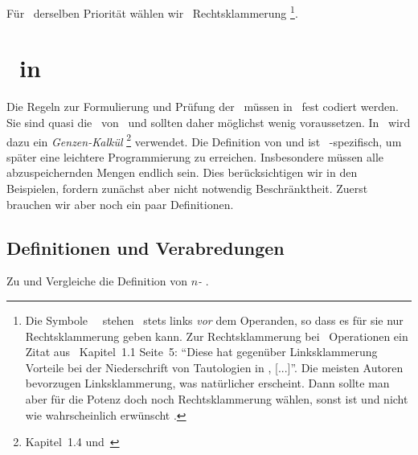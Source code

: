 Für \Operationen\ derselben Priorität wählen wir \hier\ Rechtsklammerung%
\footnote{%
	Die Symbole \unaerer\ \Operationen\ stehen \hier\ stets links \emph{vor} dem Operanden, so dass es für sie nur Rechtsklammerung geben kann.
	Zur Rechtsklammerung bei \binaeren\ Operationen ein Zitat aus~\cite{bib:Rautenberg} Kapitel~1.1 Seite~5:
	"`Diese hat gegenüber Linksklammerung Vorteile bei der Niederschrift von Tautologien in \OjkImp, [...]"'.
	Die meisten Autoren bevorzugen Linksklammerung, was natürlicher erscheint.
	Dann sollte man aber für die Potenz doch noch Rechtsklammerung wählen, sonst ist  und nicht wie wahrscheinlich erwünscht .
}.

\section[Beweise in ASBA]{\Beweise\ in \ASBA}%
\label                {sec:BeweiseASBA}

Die Regeln zur Formulierung und Prüfung der \Beweise\ müssen in \ASBA\ fest codiert werden.
Sie sind quasi die \Axiome\ von \ASBA\ und sollten daher möglichst wenig voraussetzen.
In \ASBA\ wird dazu ein \emph{Genzen-Kalkül}%
\footnote{%
	 Kapitel~1.4 und~\cite{bib:Schlussregel,bib:NatuerlichesSchliessen}
} verwendet.
Die Definition von \emph{\Schlussregel} und \emph{\Beweis} ist \hier\ \ASBA-spezifisch, um später eine leichtere Programmierung zu erreichen.
Insbesondere müssen alle abzuspeichernden Mengen endlich sein.
Dies berücksichtigen wir in den Beispielen, fordern zunächst aber nicht notwendig Beschränktheit.
Zuerst brauchen wir aber noch ein paar Definitionen.

\subsection{Definitionen und Verabredungen}%
\label                  {sub:Verabredungen}

Zu \chrqt{\MtsLen} und \chrqt{\MtsSet} Vergleiche die Definition von \emph{$n$-\Tupel} .

